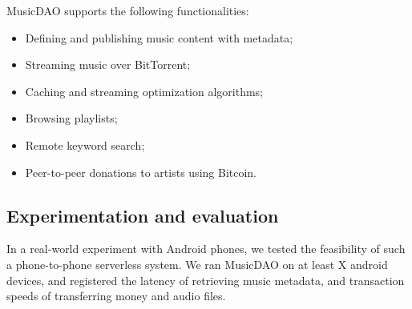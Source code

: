 MusicDAO supports the following functionalities:
\begin{itemize}
    \item Defining and publishing music content with metadata;
    \item Streaming music over BitTorrent;
    \item Caching and streaming optimization algorithms;
    \item Browsing playlists;
    \item Remote keyword search;
    \item Peer-to-peer donations to artists using Bitcoin.
\end{itemize}

\subsection{Experimentation and evaluation}
In a real-world experiment with Android phones, we tested the feasibility of such a phone-to-phone serverless system. We ran MusicDAO on at least X android devices, and registered the latency of retrieving music metadata, and transaction speeds of transferring money and audio files. 


